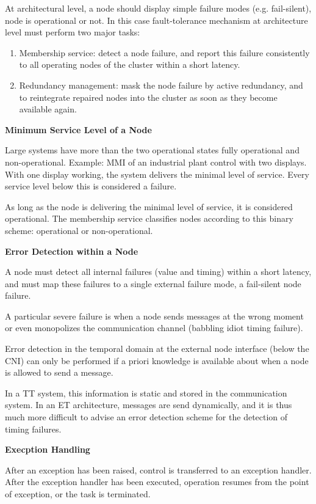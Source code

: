 At architectural level, a node should display simple failure modes (e.g.
fail-silent), node is operational or not. In this case fault-tolerance
mechanism at architecture level must perform two major tasks:

\begin{enumerate}
\def\labelenumi{\arabic{enumi}.}
\item
  Membership service: detect a node failure, and report this failure
  consistently to all operating nodes of the cluster within a short
  latency.
\item
  Redundancy management: mask the node failure by active redundancy, and
  to reintegrate repaired nodes into the cluster as soon as they become
  available again.
\end{enumerate}

\textbf{Minimum Service Level of a Node}

Large systems have more than the two operational states fully
operational and non-operational. Example: MMI of an industrial plant
control with two displays. With one display working, the system delivers
the minimal level of service. Every service level below this is
considered a failure.

As long as the node is delivering the minimal level of service, it is
considered operational. The membership service classifies nodes
according to this binary scheme: operational or non-operational.

\textbf{Error Detection within a Node}

A node must detect all internal failures (value and timing) within a
short latency, and must map these failures to a single external failure
mode, a fail-silent node failure.

A particular severe failure is when a node sends messages at the wrong
moment or even monopolizes the communication channel (babbling idiot
timing failure).

Error detection in the temporal domain at the external node interface
(below the CNI) can only be performed if a priori knowledge is available
about when a node is allowed to send a message.

In a TT system, this information is static and stored in the
communication system. In an ET architecture, messages are send
dynamically, and it is thus much more difficult to advise an error
detection scheme for the detection of timing failures.

\textbf{Execption Handling}

After an exception has been raised, control is transferred to an
exception handler. After the exception handler has been executed,
operation resumes from the point of exception, or the task is
terminated.

